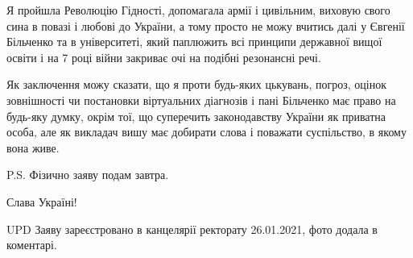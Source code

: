 Я пройшла Революцію Гідності, допомагала армії і цивільним, виховую свого сина
в повазі і любові до України, а тому просто не можу вчитись далі у Євгенії
Більченко та в університеті, який паплюжить всі принципи державної вищої освіти
і на 7 році війни закриває очі на подібні резонансні речі. 

Як заключення можу сказати, що я проти будь-яких цькувань, погроз, оцінок
зовнішності чи постановки віртуальних діагнозів і пані Більченко має право на
будь-яку думку, окрім тої, що суперечить законодавству України як приватна
особа, але як викладач вишу має добирати слова і поважати суспільство, в якому
вона живе. 

P.S. Фізично заяву подам завтра. 

Слава Україні! 

UPD Заяву зареєстровано в канцелярії ректорату 26.01.2021, фото додала в коментарі.

